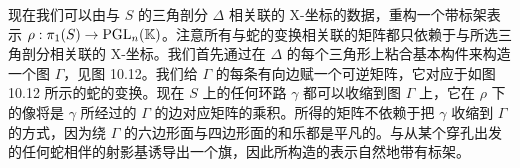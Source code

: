 现在我们可以由与 $S$ 的三角剖分 $\Delta$ 相关联的 X-坐标的数据，重构一个带标架表示 $\rho:\pi_1(S)\to\operatorname{PGL}_n(\mathbb{K})$。注意所有与蛇的变换相关联的矩阵都只依赖于与所选三角剖分相关联的 X-坐标。我们首先通过在 $\Delta$ 的每个三角形上粘合基本构件来构造一个图 $\Gamma$，见图 10.12。我们给 $\Gamma$ 的每条有向边赋一个可逆矩阵，它对应于如图 10.12 所示的蛇的变换。现在 $S$ 上的任何环路 $\gamma$ 都可以收缩到图 $\Gamma$ 上，它在 $\rho$ 下的像将是 $\gamma$ 所经过的 $\Gamma$ 的边对应矩阵的乘积。所得的矩阵不依赖于把 $\gamma$ 收缩到 $\Gamma$ 的方式，因为绕 $\Gamma$ 的六边形面与四边形面的和乐都是平凡的。与从某个穿孔出发的任何蛇相伴的射影基诱导出一个旗，因此所构造的表示自然地带有标架。



